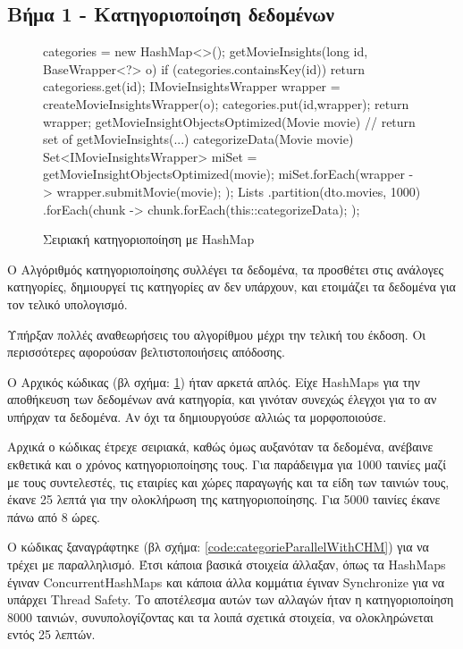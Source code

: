 \subsection{Βήμα 1 - Κατηγοριοποίηση δεδομένων}
\begin{figure}[H]
    \begin{javacode}
    categories = new HashMap<>();
    getMovieInsights(long id, BaseWrapper<?> o) {
        if (categories.containsKey(id)) {
            return categoriess.get(id);
        }
        IMovieInsightsWrapper wrapper = createMovieInsightsWrapper(o);
        categories.put(id,wrapper);
        return wrapper;
    }
    getMovieInsightObjectsOptimized(Movie movie) {
     // return set of getMovieInsights(...)
    }
    categorizeData(Movie movie) {
        Set<IMovieInsightsWrapper> miSet = getMovieInsightObjectsOptimized(movie);
        miSet.forEach(wrapper -> {
            wrapper.submitMovie(movie);
        });
    }
    Lists
      .partition(dto.movies, 1000)
      .forEach(chunk -> {
         chunk.forEach(this::categorizeData);
      });
    \end{javacode}
    \caption{Σειριακή κατηγοριοποίηση με HashMap}
   \label{code:categorieSerialWithHM}
\end{figure}
Ο Αλγόριθμός κατηγοριοποίησης συλλέγει τα δεδομένα, τα προσθέτει στις ανάλογες κατηγορίες, δημιουργεί τις κατηγορίες αν δεν υπάρχουν, και ετοιμάζει τα δεδομένα για τον τελικό υπολογισμό.

Υπήρξαν πολλές αναθεωρήσεις του αλγορίθμου μέχρι την τελική του έκδοση. Οι περισσότερες αφορούσαν βελτιστοποιήσεις απόδοσης. 

Ο Αρχικός κώδικας (βλ σχήμα: \ref{code:categorieSerialWithHM}) ήταν αρκετά απλός. Είχε HashMaps για την αποθήκευση των δεδομένων ανά κατηγορία, και γινόταν συνεχώς έλεγχοι για το αν υπήρχαν τα δεδομένα. Αν όχι τα δημιουργούσε αλλιώς τα μορφοποιούσε.

Αρχικά ο κώδικας έτρεχε σειριακά, καθώς όμως αυξανόταν τα δεδομένα, ανέβαινε εκθετικά και ο χρόνος κατηγοριοποίησης τους. Για παράδειγμα για 1000 ταινίες μαζί με τους συντελεστές, τις εταιρίες και χώρες παραγωγής και τα είδη των ταινιών τους, έκανε 25 λεπτά για την ολοκλήρωση της κατηγοριοποίησης. Για 5000 ταινίες έκανε πάνω από 8 ώρες. 

Ο κώδικας ξαναγράφτηκε (βλ σχήμα: \ref{code:categorieParallelWithCHM}) για να τρέχει με παραλληλισμό. Έτσι κάποια βασικά στοιχεία άλλαξαν, όπως τα HashMaps έγιναν ConcurrentHashMaps και κάποια άλλα κομμάτια έγιναν Synchronize για να υπάρχει Thread Safety. Το αποτέλεσμα αυτών των αλλαγών ήταν η κατηγοριοποίηση 8000 ταινιών, συνυπολογίζοντας και τα λοιπά σχετικά στοιχεία, να ολοκληρώνεται εντός 25 λεπτών.


